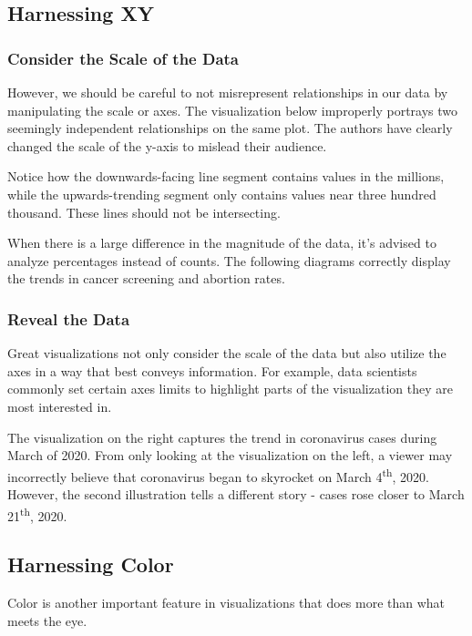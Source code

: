 \documentclass[
  letterpaper,
  DIV=11,
  numbers=noendperiod]{scrreprt}
\begin{document}
\subsection{Harnessing X\textbar Y}\label{harnessing-xy}

\subsubsection{Consider the Scale of the
Data}\label{consider-the-scale-of-the-data}

However, we should be careful to not misrepresent relationships in our
data by manipulating the scale or axes. The visualization below
improperly portrays two seemingly independent relationships on the same
plot. The authors have clearly changed the scale of the y-axis to
mislead their audience.

Notice how the downwards-facing line segment contains values in the
millions, while the upwards-trending segment only contains values near
three hundred thousand. These lines should not be intersecting.

When there is a large difference in the magnitude of the data, it's
advised to analyze percentages instead of counts. The following diagrams
correctly display the trends in cancer screening and abortion rates.

\subsubsection{Reveal the Data}\label{reveal-the-data}

Great visualizations not only consider the scale of the data but also
utilize the axes in a way that best conveys information. For example,
data scientists commonly set certain axes limits to highlight parts of
the visualization they are most interested in.

The visualization on the right captures the trend in coronavirus cases
during March of 2020. From only looking at the visualization on the
left, a viewer may incorrectly believe that coronavirus began to
skyrocket on March 4\textsuperscript{th}, 2020. However, the second
illustration tells a different story - cases rose closer to March
21\textsuperscript{th}, 2020.

\subsection{Harnessing Color}\label{harnessing-color}

Color is another important feature in visualizations that does more than
what meets the eye.
\end{document}
